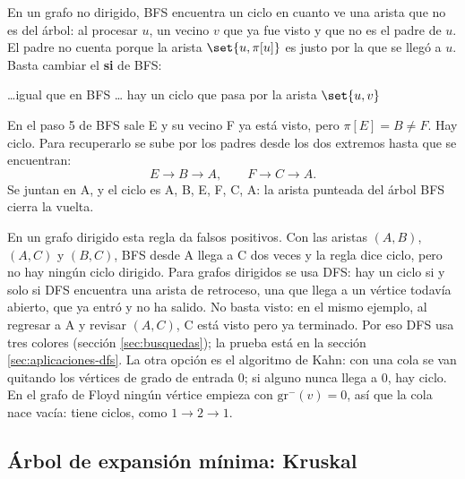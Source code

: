 \documentclass[11pt,letterpaper]{article}
\begin{document}
En un grafo no dirigido, BFS encuentra un ciclo en cuanto ve una
arista que no es del árbol: al procesar $u$, un vecino $v$ que ya fue
visto y que no es el padre de $u$. El padre no cuenta porque la arista
$\set{u, \pi[u]}$ es justo por la que se llegó a $u$. Basta cambiar el
\textbf{si} de BFS:

\begin{algorithm}[H]
\caption{Cambio a \textsc{BFS} para detectar un ciclo}
\begin{algorithmic}[1]
    \State \ldots igual que en BFS \ldots
    \State \Return hay un ciclo que pasa por la arista $\set{u, v}$
  \EndIf
\EndFor
\end{algorithmic}
\end{algorithm}

\begin{ejemplo}[El ciclo de $G$]
  En el paso 5 de BFS sale E y su vecino F ya está visto, pero
  $\pi[E] = B \neq F$. Hay ciclo. Para recuperarlo se sube por los
  padres desde los dos extremos hasta que se encuentran:
  \[
    E \to B \to A , \qquad F \to C \to A .
  \]
  Se juntan en A, y el ciclo es A, B, E, F, C, A: la arista punteada
  del árbol BFS cierra la vuelta.
\end{ejemplo}

\begin{ojo}
  En un grafo dirigido esta regla da falsos positivos. Con las aristas
  $(A, B)$, $(A, C)$ y $(B, C)$, BFS desde A llega a C dos veces y la
  regla dice ciclo, pero no hay ningún ciclo dirigido. Para grafos
  dirigidos se usa DFS: hay un ciclo si y solo si DFS encuentra una
  arista de retroceso, una que llega a un vértice todavía abierto, que
  ya entró y no ha salido. No basta $\text{visto}$: en el mismo
  ejemplo, al regresar a A y revisar $(A, C)$, C está visto pero ya
  terminado. Por eso DFS usa tres colores (sección
  \ref{sec:busquedas}); la prueba está en la sección
  \ref{sec:aplicaciones-dfs}. La otra opción es el algoritmo
  de Kahn: con una cola se van quitando los vértices de grado de
  entrada $0$; si alguno nunca llega a $0$, hay ciclo. En el grafo de
  Floyd ningún vértice empieza con $\text{gr}^{-}(v) = 0$, así que la
  cola nace vacía: tiene ciclos, como $1 \to 2 \to 1$.
\end{ojo}


\subsection*{Árbol de expansión mínima: Kruskal}
\end{document}

